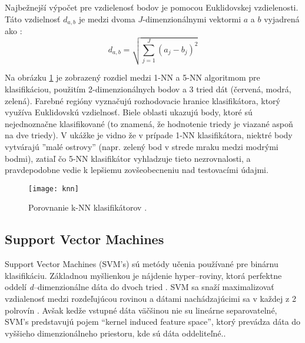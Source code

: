 Najbežnejší výpočet pre vzdielenosť bodov je pomocou Euklidovskej vzdielenosti.
Táto vzdielnosť $d_{a,b}$ je medzi dvoma $J$-dimenzionálnymi vektormi $a$ a $b$ vyjadrená ako \cite{prop:KnnClassification}:
\begin{equation}
    \label{eq:euclidMetric}
    d_{a,b} = \sqrt{\sum_{j=1}^{J}{(a_j - b_j)^2}}
\end{equation}

Na obrázku \ref{pic:kNN} je zobrazený rozdiel medzi 1-NN a 5-NN algoritmom pre klasifikáciou,
    použitím 2-dimenzionálnych bodov a 3 tried dát (červená, modrá, zelená).
Farebné regióny vyznačujú rozhodovacie hranice klasifikátora, ktorý využíva Euklidovskú vzdielnosť.
Biele oblasti ukazujú body, ktoré sú nejednoznačne klasifikované (to znamená, že hodnotenie triedy je viazané aspoň na dve triedy).
V ukážke je vidno že v prípade 1-NN klasifikátora, niektré body vytvárajú ''malé ostrovy''
    (napr. zelený bod v strede mraku medzi modrými bodmi), zatiaľ čo 5-NN klasifikátor vyhladzuje tieto nezrovnalosti,
    a pravdepodobne vedie k lepšiemu zovšeobecneniu nad testovacími údajmi.

\begin{figure}[H]
	\centering
	\texttt{[image: knn]}
	\caption{Porovnanie k-NN klasifikátorov \cite{odkaz:KnnImage}.}
	\label{pic:kNN}
\end{figure}



\subsection{Support Vector Machines}
Support Vector Machines (SVM's) sú metódy učenia používané pre binárnu klasifikáciu.
Základnou myšlienkou je nájdenie hyper--roviny, ktorá perfektne oddelí \textit{d}--dimenzionálne dáta do dvoch tried \cite{prop:IntroductionToSVM}.
SVM sa snaží maximalizovať vzdialenosť medzi rozdeľujúcou rovinou a dátami nachádzajúcimi sa v každej z 2 polrovín \cite{prop:SupervisedMachineLearning}.
Avšak kedže vstupné dáta väčšinou nie su lineárne separovatelné, SVM's predstavujú pojem “kernel induced feature space”,
    ktorý prevádza dáta do vyššieho dimenzionálneho priestoru, kde sú dáta oddeliteľné.\cite{prop:IntroductionToSVM}.

